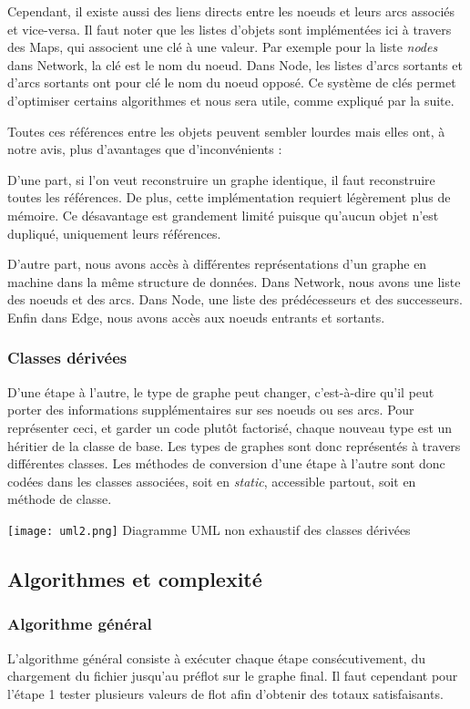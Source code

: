 \documentclass[letterpaper,12pt]{article}
\begin{document}
Cependant, il existe aussi des liens directs entre les noeuds et leurs arcs associés et vice-versa. Il faut noter que les listes d'objets sont implémentées ici à travers des Maps, qui associent une clé à une valeur. Par exemple pour la liste \textit{nodes} dans Network, la clé est le nom du noeud. Dans Node, les listes d'arcs sortants et d'arcs sortants ont pour clé le nom du noeud opposé. Ce système de clés permet d'optimiser certains algorithmes et nous sera utile, comme expliqué par la suite.

Toutes ces références entre les objets peuvent sembler lourdes mais elles ont, à notre avis, plus d'avantages que d'inconvénients : 

D'une part, si l'on veut reconstruire un graphe identique, il faut reconstruire toutes les références. De plus, cette implémentation requiert légèrement plus de mémoire. Ce désavantage est grandement limité puisque qu'aucun objet n'est dupliqué, uniquement leurs références. 

D'autre part, nous avons accès à différentes représentations d'un graphe en machine dans la même structure de données. Dans Network, nous avons une liste des noeuds et des arcs. Dans Node, une liste des prédécesseurs et des successeurs. Enfin dans Edge, nous avons accès aux noeuds entrants et sortants.

\subsubsection{Classes dérivées}
D'une étape à l'autre, le type de graphe peut changer, c'est-à-dire qu'il peut porter des informations supplémentaires sur ses noeuds ou ses arcs. Pour représenter ceci, et garder un code plutôt factorisé, chaque nouveau type est un héritier de la classe de base. Les types de graphes sont donc représentés à travers différentes classes. Les méthodes de conversion d'une étape à l'autre sont donc codées dans les classes associées, soit en \textit{static}, accessible partout, soit en méthode de classe.

\begin{center}
    \texttt{[image: uml2.png]}
    Diagramme UML non exhaustif des classes dérivées
\end{center}

\subsection{Algorithmes et complexité} 
\subsubsection{Algorithme général}
L'algorithme général consiste à exécuter chaque étape consécutivement, du chargement du fichier jusqu'au préflot sur le graphe final. Il faut cependant pour l'étape 1 tester plusieurs valeurs de flot afin d'obtenir des totaux satisfaisants.
\end{document}
